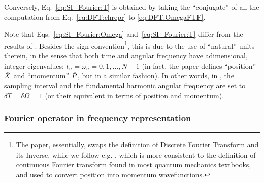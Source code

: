 Conversely, Eq.~\eqref{eq:SI_Fourier:T} is obtained by
taking the ``conjugate'' of all the computation
from Eq.~\eqref{eq:DFT:chrepr} to \eqref{eq:DFT:OmegaFTF}.

Note that Eqs.~\eqref{eq:SI_Fourier:Omega} and~\eqref{eq:SI_Fourier:T}
differ from the results of \cite{FiniteHilb}.
Besides the sign convention\footnote{
  The paper, essentially, swaps the definition of Discrete Fourier Transform and its Inverse,
  while we follow e.g. \cite[Sec. 7.6]{Folland:Fourier},
  which is more consistent to the definition of continuous Fourier transform
  found in most quantum mechanics textbooks,
  and used to
  convert position into momentum wavefunctions.
},
this is due to the use of
``natural'' units therein,
in the sense that
both time and angular frequency
have adimensional, integer eigenvalues:
$t_n = \omega_n = 0, 1, \dots, N-1$
(in fact, the paper defines ``position'' $\hat{X}$ and ``momentum'' $\hat{P}$,
but in a similar fashion).
In other words, in \citereset\cite{FiniteHilb}, the sampling interval and the fundamental harmonic angular frequency
are set to $\delta{T} = \delta{\Omega} = 1$ (or their equivalent in terms of position and momentum).

\subsubsection{Fourier operator in frequency representation}




